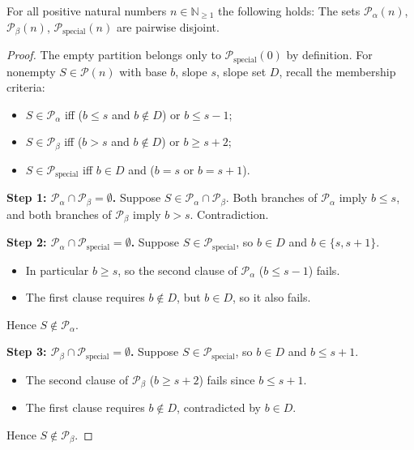 \begin{lemma}\label{lemma:alpha-beta-special-disjoint}\leanok
  For all positive natural numbers $n\in \mathbb{N}_{\geq 1}$ the following holds: The sets $\mathcal{P}_{\alpha}(n)$, $\mathcal{P}_{\beta}(n)$,  $\mathcal{P}_{\mathrm{special}}(n)$ are pairwise disjoint.

\end{lemma}
\begin{proof}\leanok
The empty partition belongs only to $\mathcal{P}_{\mathrm{special}}(0)$ by definition. For nonempty $S \in \mathcal{P}(n)$ with base $b$, slope $s$, slope set $D$, recall the membership criteria:
\begin{itemize}
\item $S \in \mathcal{P}_\alpha$ iff ($b \leq s$ and $b \notin D$) or $b \leq s - 1$;
\item $S \in \mathcal{P}_\beta$ iff ($b > s$ and $b \notin D$) or $b \geq s + 2$;
\item $S \in \mathcal{P}_{\mathrm{special}}$ iff $b \in D$ and ($b = s$ or $b = s + 1$).
\end{itemize}

\textbf{Step 1: $\mathcal{P}_\alpha \cap \mathcal{P}_\beta = \emptyset$.}
Suppose $S \in \mathcal{P}_\alpha \cap \mathcal{P}_\beta$. Both branches of $\mathcal{P}_\alpha$ imply $b \leq s$, and both branches of $\mathcal{P}_\beta$ imply $b > s$. Contradiction.

\textbf{Step 2: $\mathcal{P}_\alpha \cap \mathcal{P}_{\mathrm{special}} = \emptyset$.}
Suppose $S \in \mathcal{P}_{\mathrm{special}}$, so $b \in D$ and $b \in \{s, s + 1\}$.
\begin{itemize}
\item In particular $b \geq s$, so the second clause of $\mathcal{P}_\alpha$ ($b \leq s - 1$) fails.
\item The first clause requires $b \notin D$, but $b \in D$, so it also fails.
\end{itemize}
Hence $S \notin \mathcal{P}_\alpha$.

\textbf{Step 3: $\mathcal{P}_\beta \cap \mathcal{P}_{\mathrm{special}} = \emptyset$.}
Suppose $S \in \mathcal{P}_{\mathrm{special}}$, so $b \in D$ and $b \leq s + 1$.
\begin{itemize}
\item The second clause of $\mathcal{P}_\beta$ ($b \geq s + 2$) fails since $b \leq s + 1$.
\item The first clause requires $b \notin D$, contradicted by $b \in D$.
\end{itemize}
Hence $S \notin \mathcal{P}_\beta$.
\end{proof}

